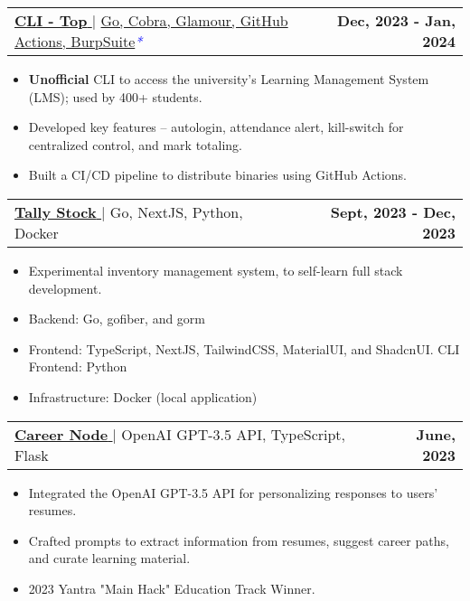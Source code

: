 \documentclass[letterpaper,11pt]{article}
\makeatletter
\newcommand{\uniformunderline}[1]{%
  \uline{\phantom{#1}}%
  \llap{\contour{white}{#1}}%
}
\newcommand{\resumeItem}[1]{
  \item\small{
    {#1 \vspace{-2pt}}
  }
}
\newcommand{\resumeProjectHeading}[2]{
    \item
    \begin{tabular*}{1.001\textwidth}{l@{\extracolsep{\fill}}r}
      \small#1 & \textbf{\small #2}\\
    \end{tabular*}\vspace{-7pt}
}
\newcommand{\resumeItemListStart}{\begin{itemize}}
\newcommand{\resumeItemListEnd}{\end{itemize}\vspace{-5pt}}
\makeatother
\begin{document}
        \resumeProjectHeading
            {\href{https://cli-top.acmvit.in}{\textbf{\large{CLI - Top}} \href{https://cli-top.acmvit.in}{\raisebox{-0.1\height}\faExternalLink }} $|$ \normalsize{\href{https://github.com/ACM-VIT/cli-top}{Go, Cobra, Glamour, GitHub Actions, BurpSuite}}\textcolor{blue}{\small{\textit{*}}}}{Dec, 2023 - Jan, 2024}
            \vspace{-11pt}
            \resumeItemListStart
                \resumeItem{\normalsize{\textbf{Unofficial} CLI to access the university's Learning Management System (LMS); used by 400+ students.}} 
                \resumeItem{\normalsize{Developed key features -- autologin, attendance alert, kill-switch for centralized control, and mark totaling.}}
                \resumeItem{\normalsize{Built a CI/CD pipeline to distribute binaries using GitHub Actions.}}
            \resumeItemListEnd
            \vspace{-15pt}
      
        \resumeProjectHeading
            {\href{https://github.com/saharshbhansali/TallyStock}{\textbf{\large{Tally Stock}} \href{https://github.com/saharshbhansali/TallyStock}{\raisebox{-0.1\height}\faExternalLink }} $|$ \normalsize{Go, NextJS, Python, Docker}}{Sept, 2023 - Dec, 2023}
            \vspace{-11pt}
            \resumeItemListStart
                \resumeItem{\normalsize{Experimental inventory management system, to self-learn full stack development.}} 
                \resumeItem{\normalsize{Backend: Go, gofiber, and gorm}} 
                \resumeItem{\normalsize{Frontend: TypeScript, NextJS, TailwindCSS, MaterialUI, and ShadcnUI. CLI Frontend: Python}}
                \resumeItem{\normalsize{Infrastructure: Docker (local application)}}
            \resumeItemListEnd
            \vspace{-15pt}

        \resumeProjectHeading
            {\href{https://github.com/kaushalrathi24/funtimeError}{\textbf{\large{Career Node}} \href{https://github.com/kaushalrathi24/funtimeError}{\raisebox{-0.1\height}\faExternalLink }} $|$ \normalsize{OpenAI GPT-3.5 API, TypeScript, Flask}}{June, 2023}
            \vspace{-11pt}
            \resumeItemListStart
                \resumeItem{\normalsize{Integrated the OpenAI GPT-3.5 API for personalizing responses to users' resumes.}} 
                \resumeItem{\normalsize{Crafted prompts to extract information from resumes, suggest career paths, and curate learning material.}} 
                \resumeItem{\normalsize{2023 Yantra "Main Hack" Education Track Winner.}} \vspace{-0.1pt}
            \resumeItemListEnd 
            \vspace{-15pt}
\end{document}
